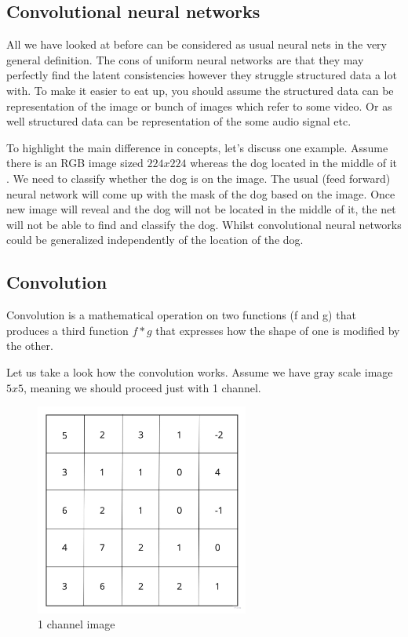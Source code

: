\subsection{Convolutional neural networks}
All we have looked at before can be considered as usual neural nets in the very general definition. The cons of uniform neural networks are that they may perfectly find the latent consistencies however they struggle structured data a lot with. To make it easier to eat up, you should assume the structured data can be representation of the image or bunch of images which refer to some video. Or as well structured data can be representation of the some audio signal etc.

To highlight the main difference in concepts, let's discuss one example.
Assume there is an RGB image sized $224x224$ whereas the dog located in the middle of it . We need to classify whether the dog is on the image. The usual (feed forward) neural network will come up with the mask of the dog based on the image. Once new image will reveal and the dog will not be located in the middle of it, the net will not be able to find and classify the dog. Whilst convolutional neural networks could be generalized independently of the location of the dog.         

\subsection{Convolution}
Convolution is a mathematical operation on two functions (f and g) that produces a third function $f*g$ that expresses how the shape of one is modified by the other.

Let us take a look how the convolution works. Assume we have gray scale image $5x5$, meaning we should proceed just with 1 channel.

\begin{figure}[h]
    \centering \includegraphics[width=7cm]{images/1_channel.jpg}
    \caption {1 channel image}
\end{figure}

